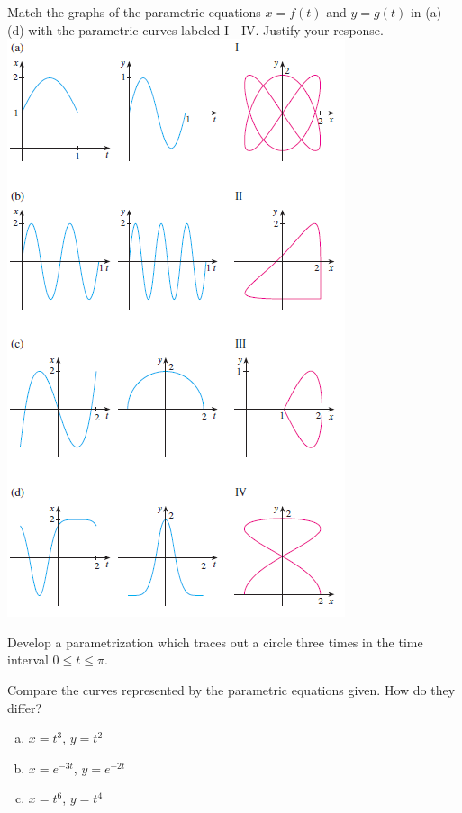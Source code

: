 \documentclass[notes2924]{subfiles}
\begin{document}
		\begin{ex}
			Match the graphs of the parametric equations $x = f(t)$ and $y = g(t)$ in (a)-(d) with the parametric curves labeled I - IV.  Justify your response.\\
			\includegraphics[scale = 1.25]{101_1.png}
		\end{ex}
			\newpage
			
		\begin{ex}
			Develop a parametrization which traces out a circle three times in the time interval $0\leq t \leq \pi$.
		\end{ex}
			
		\begin{ex}
			Compare the curves represented by the parametric equations given.  How do they differ?
			\begin{enumerate}[(a)]
				\item $x = t^3$, $y = t^2$
				\item $x = e^{-3t}$, $y =e^{-2t}$
				\item $x = t^6$, $y = t^4$
			\end{enumerate}
		\end{ex}
			\newpage
			
\end{document}
